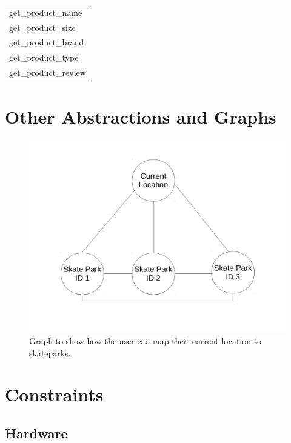 {{{\begin{center}
\begin{tabular}{|p{5cm}|}
get\_product\_name \\
get\_product\_size \\
get\_product\_brand \\
get\_product\_type \\
get\_product\_review \\
\hline

\end{tabular}
\label{tab:Review Class Definition}
\end{center}




\section{Other Abstractions and Graphs}


\begin{figure}[H]
    \includegraphics[width=\textwidth]{./Analysis/SkateparkMapping.pdf}
    \caption{Graph to show how the user can map their current location to skateparks.} \label{fig:Skatepark Graph}
\end{figure}














\section{Constraints}

\subsection{Hardware}

}}}
